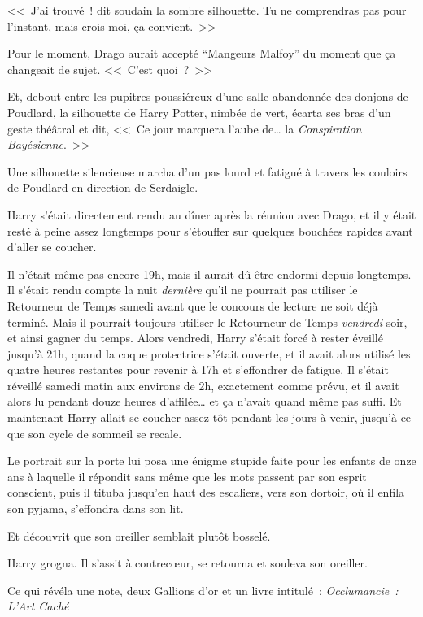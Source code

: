 <<~J'ai trouvé~! dit soudain la sombre silhouette. Tu ne comprendras pas pour l'instant, mais crois-moi, ça convient.~>>

Pour le moment, Drago aurait accepté “Mangeurs Malfoy” du moment que ça changeait de sujet. <<~C'est quoi~?~>>

Et, debout entre les pupitres poussiéreux d'une salle abandonnée des donjons de Poudlard, la silhouette de Harry Potter, nimbée de vert, écarta ses bras d'un geste théâtral et dit, <<~Ce jour marquera l'aube de… la \emph{Conspiration Bayésienne}.~>>

\later

Une silhouette silencieuse marcha d'un pas lourd et fatigué à travers les couloirs de Poudlard en direction de Serdaigle.

Harry s'était directement rendu au dîner après la réunion avec Drago, et il y était resté à peine assez longtemps pour s'étouffer sur quelques bouchées rapides avant d'aller se coucher.

Il n'était même pas encore 19h, mais il aurait dû être endormi depuis longtemps. Il s'était rendu compte la nuit \emph{dernière} qu'il ne pourrait pas utiliser le Retourneur de Temps samedi avant que le concours de lecture ne soit déjà terminé. Mais il pourrait toujours utiliser le Retourneur de Temps \emph{vendredi} soir, et ainsi gagner du temps. Alors vendredi, Harry s'était forcé à rester éveillé jusqu'à 21h, quand la coque protectrice s'était ouverte, et il avait alors utilisé les quatre heures restantes pour revenir à 17h et s'effondrer de fatigue. Il s'était réveillé samedi matin aux environs de 2h, exactement comme prévu, et il avait alors lu pendant douze heures d'affilée… et ça n'avait quand même pas suffi. Et maintenant Harry allait se coucher assez tôt pendant les jours à venir, jusqu'à ce que son cycle de sommeil se recale.

Le portrait sur la porte lui posa une énigme stupide faite pour les enfants de onze ans à laquelle il répondit sans même que les mots passent par son esprit conscient, puis il tituba jusqu'en haut des escaliers, vers son dortoir, où il enfila son pyjama, s'effondra dans son lit.

Et découvrit que son oreiller semblait plutôt bosselé.

Harry grogna. Il s'assit à contrecœur, se retourna et souleva son oreiller.

Ce qui révéla une note, deux Gallions d'or et un livre intitulé~: \emph{Occlumancie~: L'Art Caché}


